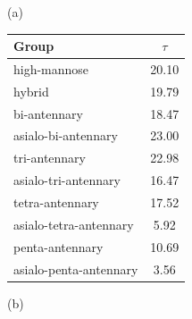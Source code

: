     \begin{table}
        \begin{minipage}[t]{0.25\linewidth}
            \vspace{0pt}
            (a)
            \centering
            
    \begin{tabular}{l | c}
        Group & $\tau$ \\
        \hline
        high-mannose & 20.10 \\
        hybrid & 19.79 \\
        bi-antennary & 18.47 \\
        asialo-bi-antennary & 23.00 \\
        tri-antennary & 22.98 \\
        asialo-tri-antennary & 16.47 \\
        tetra-antennary & 17.52 \\
        asialo-tetra-antennary & 5.92 \\
        penta-antennary & 10.69 \\
        asialo-penta-antennary & 3.56 \\
    \end{tabular}
    
            
        \end{minipage}
        \hspace{1cm}
        \begin{minipage}[t]{0.55\linewidth}
            \vspace{0pt}
            (b)
            \centering
            

\end{minipage}
\end{table}
